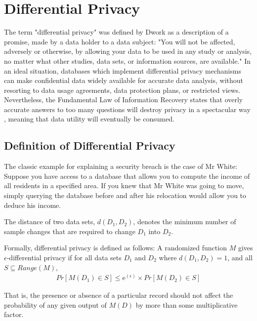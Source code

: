 \section{Differential Privacy}
\label{section:differential_privacy}
The term "differential privacy" was defined by Dwork as a description of a promise, made by a data holder to a data subject: "You will not be affected, adversely or otherwise, by allowing your data to be used in any study or analysis, no matter what other studies, data sets, or information sources, are available." \citep{dwork2013algorithmic}
In an ideal situation, databases which implement differential privacy mechanisms can make confidential data widely available for accurate data analysis, without resorting to data usage agreements, data protection plans, or restricted views. Nevertheless, the Fundamental Law of Information Recovery states that overly accurate answers to too many questions will destroy privacy in a spectacular way \citep{dwork2013algorithmic}, meaning that data utility will eventually be consumed.

\subsection{Definition of Differential Privacy}
The classic example for explaining a security breach is the case of Mr White: Suppose you have access to a database that allows you to compute the income of all residents in a specified area. If you knew that Mr White was going to move, simply querying the database before and after his relocation would allow you to deduce his income. 

\begin{definition} The distance of two data sets, $d(D_1, D_2)$, denotes the minimum number of sample changes that are required to change $D_1$ into $D_2$.
\end{definition}

Formally, differential privacy is defined as follows:
A randomized function $M$ gives $\epsilon$-differential privacy if for all data sets $D_1$ and $D_2$ where $d(D_1, D_2)=1$, and all $S\subseteq Range(M)$,
\begin{eqnarray} \label{DiffPrivDef}
 Pr[M(D_1)\in S]\leq \mathrm{e}^{(\epsilon)}\times Pr[M(D_2)\in S]
 \end{eqnarray}

That is, the presence or absence of a particular record should not affect the probability of any given output of $M(D)$ by more than some multiplicative factor. 

